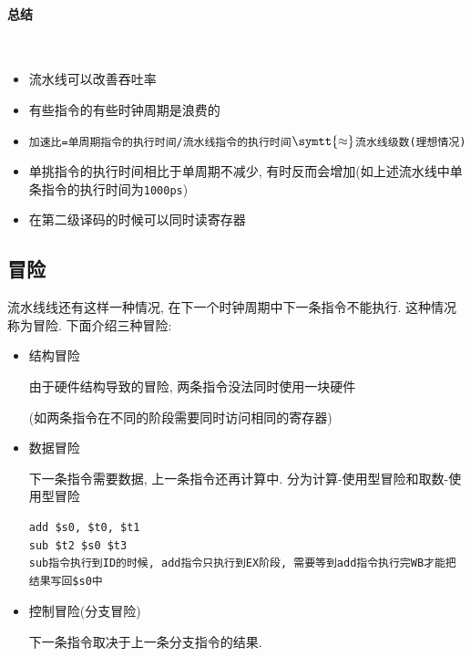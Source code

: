 \paragraph{总结}~{} 
\begin{itemize}
\item 流水线可以改善吞吐率
\item 有些指令的有些时钟周期是浪费的
\item \verb|加速比=单周期指令的执行时间/流水线指令的执行时间|$ \symtt{\approx} $\verb|流水线级数(理想情况)|
\item 单挑指令的执行时间相比于单周期不减少, 有时反而会增加(如上述流水线中单条指令的执行时间为\verb|1000ps|)
\item 在第二级译码的时候可以同时读寄存器
\end{itemize}
\subsection{冒险}
流水线线还有这样一种情况, 在下一个时钟周期中下一条指令不能执行. 这种情况称为冒险. 下面介绍三种冒险:
\begin{itemize}
\item 结构冒险 \par 由于硬件结构导致的冒险, 两条指令没法同时使用一块硬件 \par (如两条指令在不同的阶段需要同时访问相同的寄存器)
\item 数据冒险 \par 下一条指令需要数据, 上一条指令还再计算中. 分为计算-使用型冒险和取数-使用型冒险
\begin{lstlisting}
add $s0, $t0, $t1
sub $t2 $s0 $t3
sub指令执行到ID的时候, add指令只执行到EX阶段, 需要等到add指令执行完WB才能把结果写回$s0中
\end{lstlisting}
\item 控制冒险(分支冒险) \par 下一条指令取决于上一条分支指令的结果.
\end{itemize}
